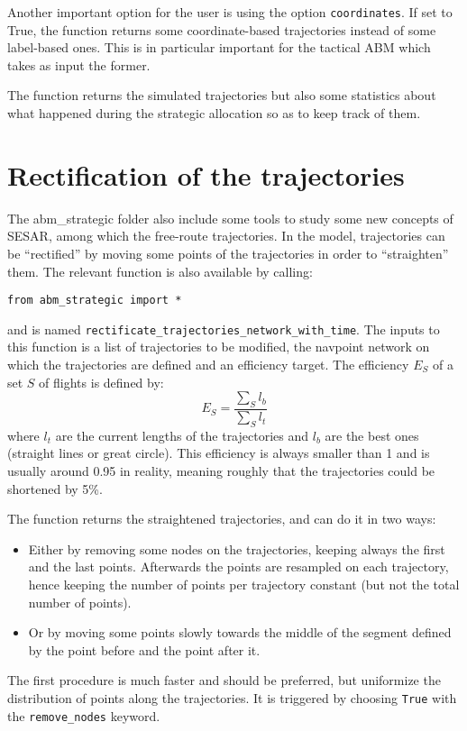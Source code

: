 \documentclass[12pt]{article}
\begin{document}
Another important option for the user is using the option \verb|coordinates|. If set to True, the function returns some coordinate-based trajectories instead of some label-based ones. This is in particular important for the tactical ABM which takes as input the former.

The function returns the simulated trajectories but also some statistics about what happened during the strategic allocation so as to keep track of them.

\section{Rectification of the trajectories}
\label{sec:rectification}

The abm\_strategic folder also include some tools to study some new concepts of SESAR, among which the free-route trajectories. In the model, trajectories can be ``rectified'' by moving some points of the trajectories in order to ``straighten'' them. The relevant function is also available by calling:
\begin{verbatim}
from abm_strategic import *
\end{verbatim}
and is named \verb|rectificate_trajectories_network_with_time|. The inputs to this function is a list of trajectories to be modified, the navpoint network on which the trajectories are defined and an efficiency target. The efficiency $E_S$ of a set $S$ of flights is defined by:
$$
E_S = \frac{\sum_S l_b}{\sum_S l_t}
$$
where $l_t$ are the current lengths of the trajectories and $l_b$ are the best ones (straight lines or great circle). This efficiency is always smaller than 1 and is usually around 0.95 in reality, meaning roughly that the trajectories could be shortened by 5\%.

The function returns the straightened trajectories, and can do it in two ways:
\begin{itemize}
\item Either by removing some nodes on the trajectories, keeping always the first and the last points. Afterwards the points are resampled on each trajectory, hence keeping the number of points per trajectory constant (but not the total number of points).
\item Or by moving some points slowly towards the middle of the segment defined by the point before and the point after it.
\end{itemize}
The first procedure is much faster and should be preferred, but uniformize the distribution of points along the trajectories. It is triggered by choosing \verb|True| with the \verb|remove_nodes| keyword.
\end{document}
